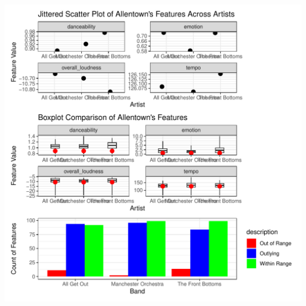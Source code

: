 \documentclass{article}\usepackage[]{graphicx}\usepackage[]{xcolor}
\makeatletter
\def\maxwidth{ %
  \ifdim\Gin@nat@width>\linewidth
    \linewidth
  \else
    \Gin@nat@width
  \fi
}
\newenvironment{knitrout}{}{} %
\makeatother
\begin{document}
\begin{multicols}{2}
\begin{knitrout}\scriptsize
{}\color{fgcolor}
\includegraphics[width=\maxwidth]{figure/unnamed-chunk-1-1} 
\end{knitrout}

\vspace{2em}

\begin{tiny}

\end{tiny}
\end{multicols}

\newpage
\onecolumn
\end{document}
